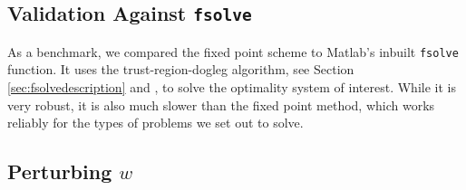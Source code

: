 \documentclass[11pt, a4paper]{article}
\theoremstyle{definition}
\begin{document}
\subsection{Validation Against \texttt{fsolve}}
As a benchmark, we compared the fixed point scheme to Matlab's inbuilt \texttt{fsolve} function. It uses the trust-region-dogleg algorithm, see Section \ref{sec:fsolvedescription} and \cite{Powell1}, to solve the optimality system of interest. While it is very robust, it is also much slower than the fixed point method, which works reliably for the types of problems we set out to solve. 


\subsection{Perturbing $w$}

\end{document}
